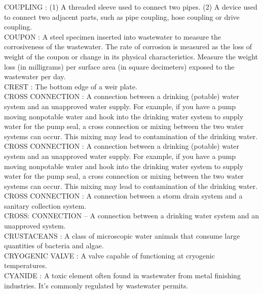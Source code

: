 \vspace{0.15cm}
COUPLING :  (1) A threaded sleeve used to connect two pipes. (2) A device used to connect two adjacent parts, such as pipe coupling, hose coupling or drive coupling. \\
\vspace{0.15cm}
COUPON :  A steel specimen inserted into wastewater to measure the corrosiveness of the wastewater. The rate of corrosion is measured as the loss of weight of the coupon or change in its physical characteristics. Measure the weight loss (in milligrams) per surface area (in square decimeters) exposed to the wastewater per day. \\
\vspace{0.15cm}
CREST :  The bottom edge of a weir plate.\\
\vspace{0.15cm}
CROSS CONNECTION :  A connection between a drinking (potable) water system and an unapproved water supply. For example, if you have a pump moving nonpotable water and hook into the drinking water system to supply water for the pump seal, a cross connection or mixing between the two water systems can occur. This mixing may lead to contamination of the drinking water.\\
\vspace{0.15cm}
CROSS CONNECTION :  A connection between a drinking (potable) water system and an unapproved water supply. For example, if you have a pump moving nonpotable water and hook into the drinking water system to supply water for the pump seal, a cross connection or mixing between the two water systems can occur. This mixing may lead to contamination of the drinking water.\\
\vspace{0.15cm}
CROSS CONNECTION :  A connection between a storm drain system and a sanitary collection system. \\
\vspace{0.15cm}
CROSS: CONNECTION – A connection between a drinking water system and an unapproved system.\\
\vspace{0.15cm}
CRUSTACEANS :  A class of microscopic water animals that consume large quantities of bacteria and algae.\\
\vspace{0.15cm}
CRYOGENIC VALVE :   A valve capable of functioning at cryogenic temperatures.\\
\vspace{0.15cm}
CYANIDE :   A toxic element often found in wastewater from metal finishing industries. It’s commonly regulated by wastewater permits.\\
